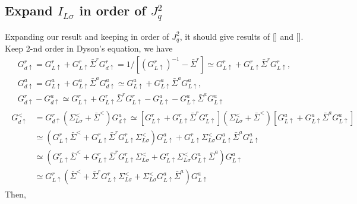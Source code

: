 \documentclass[aps,prb,superscriptaddress]{revtex4-2}
\begin{document}
\subsection{Expand $I_{L\sigma}$ in order of $J_q^2$ }
Expanding our result and keeping in order of $J_q^2$, it should give results of [] and []. Keep 2-nd order in Dyson's equation, we have
\begin{gather}
G^r_{d\uparrow} =G^r_{L\uparrow} + G^r_{L\uparrow} {\bar \Sigma}^r G^r_{d\uparrow} = 1/[(G^r_{L\uparrow})^{-1} - {\bar \Sigma}^r] \simeq G^r_{L\uparrow} + G^r_{L\uparrow} {\bar \Sigma}^r G^r_{L\uparrow} ,\\
G^a_{d\uparrow} =G^a_{L\uparrow} + G^a_{L\uparrow} {\bar \Sigma}^a G^a_{d\uparrow} \simeq G^a_{L\uparrow} + G^a_{L\uparrow} {\bar \Sigma}^a G^a_{L\uparrow} , \\
G^r_{d\uparrow} - G^a_{d\uparrow} \simeq G^r_{L\uparrow} + G^r_{L\uparrow} {\bar \Sigma}^r G^r_{L\uparrow} - G^a_{L\uparrow} - G^a_{L\uparrow} {\bar \Sigma}^a G^a_{L\uparrow}
\end{gather}
\begin{gather}
\begin{split}
 G^<_{d\uparrow} &=  G^r_{d\uparrow} ( {\Sigma_{L\sigma}^{<} + \bar \Sigma}^<) G^a_{d\uparrow} \simeq [G^r_{L\uparrow} + G^r_{L\uparrow} {\bar \Sigma}^r G^r_{L\uparrow}] ( {\Sigma_{L\sigma}^{<} + \bar \Sigma}^<) [G^a_{L\uparrow} + G^a_{L\uparrow} {\bar \Sigma}^a G^a_{L\uparrow}] \\
& \simeq (G^r_{L\uparrow} \bar\Sigma^{<} + G^r_{L\uparrow} {\bar \Sigma}^r G^r_{L\uparrow}\Sigma_{L\sigma}^{<})G^a_{L\uparrow} + G^r_{L\uparrow} \Sigma_{L\sigma}^{<} G^a_{L\uparrow} {\bar \Sigma}^a G^a_{L\uparrow} \\
&\simeq (G^r_{L\uparrow} \bar\Sigma^{<} + G^r_{L\uparrow} {\bar \Sigma}^r G^r_{L\uparrow}\Sigma_{L\sigma}^{<} + G^r_{L\uparrow} \Sigma_{L\sigma}^{<} G^a_{L\uparrow} {\bar \Sigma}^a )G^a_{L\uparrow} \\
&\simeq G^r_{L\uparrow}( \bar\Sigma^{<} +  {\bar \Sigma}^r G^r_{L\uparrow}\Sigma_{L\sigma}^{<} + \Sigma_{L\sigma}^{<} G^a_{L\uparrow} {\bar \Sigma}^a )G^a_{L\uparrow}
\end{split}
\end{gather}
Then,
\end{document}
